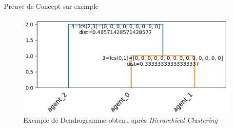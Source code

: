     \begin{frame}[fragile]{Preuve de Concept sur exemple}

        \begin{figure}
            \includegraphics[width=0.7\linewidth]{figures/role_clustering.png}
            \caption*{Exemple de Dendrogramme obtenu après \textit{Hierarchical Clustering}}
        \end{figure}

    \end{frame}
        

